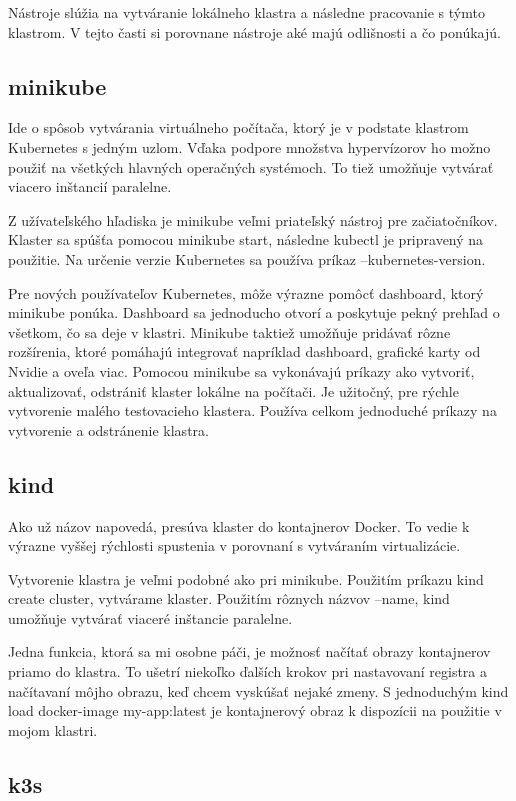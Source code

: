 Nástroje slúžia na vytváranie lokálneho klastra a následne pracovanie s týmto klastrom. V tejto časti si porovnane nástroje aké majú odlišnosti a čo ponúkajú.
\subsection*{minikube}

Ide o spôsob vytvárania virtuálneho počítača, ktorý je v podstate klastrom Kubernetes s jedným uzlom. Vďaka podpore množstva hypervízorov ho možno použiť na všetkých hlavných operačných systémoch. To tiež umožňuje vytvárať viacero inštancií paralelne.

Z užívateľského hľadiska je minikube veľmi priateľský nástroj pre začiatočníkov. Klaster sa spúšťa pomocou minikube start, následne kubectl je pripravený na použitie. Na určenie verzie Kubernetes sa používa príkaz --kubernetes-version.

Pre nových používateľov Kubernetes, môže výrazne pomôcť dashboard, ktorý minikube ponúka. Dashboard sa jednoducho otvorí a poskytuje pekný prehľad o všetkom, čo sa deje v klastri. Minikube taktiež umožňuje pridávať rôzne rozšírenia, ktoré pomáhajú integrovať napríklad dashboard, grafické karty od Nvidie a oveľa viac. Pomocou minikube sa vykonávajú príkazy ako vytvoriť, aktualizovať, odstrániť klaster lokálne na počítači. Je užitočný, pre rýchle vytvorenie malého testovacieho klastera. Používa celkom jednoduché príkazy na vytvorenie a odstránenie klastra.

\subsection*{kind}

Ako už názov napovedá, presúva klaster do kontajnerov Docker. To vedie k výrazne vyššej rýchlosti spustenia v porovnaní s vytváraním virtualizácie.

Vytvorenie klastra je veľmi podobné ako pri minikube. Použitím príkazu kind create cluster, vytvárame klaster. Použitím rôznych názvov  --name, kind umožňuje vytvárať viaceré inštancie paralelne.

Jedna funkcia, ktorá sa mi osobne páči, je možnosť načítať obrazy kontajnerov priamo do klastra. To ušetrí niekoľko ďalších krokov pri nastavovaní registra a načítavaní môjho obrazu, keď chcem vyskúšať nejaké zmeny. S jednoduchým kind load docker-image my-app:latest je kontajnerový obraz k dispozícii na použitie v mojom klastri.

\subsection*{k3s}

